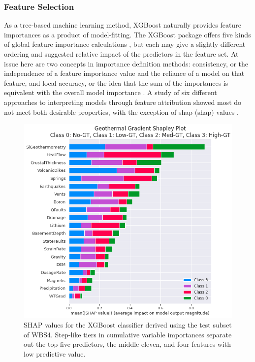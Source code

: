 \subsubsection{Feature Selection}\label{ch5:xgb_shapley}

As a tree-based machine learning method, XGBoost naturally provides feature importances as a product of model-fitting. The XGBoost package offers five kinds of global feature importance calculations \citep{xgboost_developers_xgboost_2020}, but each may give a slightly different ordering and suggested relative impact of the predictors in the feature set. At issue here are two concepts in importance definition methods: consistency, or the independence of a feature importance value and the reliance of a model on that feature, and local accuracy, or the idea that the sum of the importances is equivalent with the overall model importance \citep{lundberg_interpretable_2020}. A study of six different approaches to interpreting models through feature attribution showed most do not meet both desirable properties, with the exception of \acrlong{shap} (\acrshort{shap}) values \citep{lundberg_consistent_2019}.

\begin{figure}[htp]
\centering
\includegraphics[width=\textwidth]{templates/images/Figure-Shapley.png}
\caption[XGBoost SHAP values]{SHAP values for the XGBoost classifier derived using the test subset of WBS4. Step-like tiers in cumulative variable importances separate out the top five predictors, the middle eleven, and four features with low predictive value.}
\label{fig:xgb_shap_global}
\end{figure}

